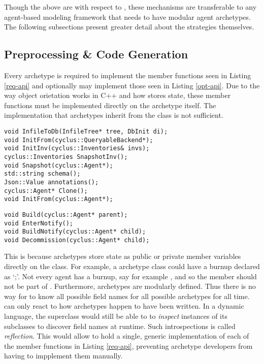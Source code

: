 Though the above are with respect to \cyclus, these mechanisms are 
transferable to any agent-based modeling framework that needs to have modular agent 
archetypes. The following subsections present greater detail about the 
strategies themselves.

\subsection{Preprocessing \& Code Generation}

Every \cyclus archetype is required to implement the member functions 
seen in Listing \ref{req-api} and optionally may implement those seen in 
Listing \ref{opt-api}. Due to the way object orietation works in 
C++ and how \cyclus stores state, these member functions must be implemented directly
on the archetype itself. The implementation that archetypes inherit 
from the  class is not sufficient. 

\begin{lstlisting}[caption={Required Archetype API}, label=req-api]
void InfileToDb(InfileTree* tree, DbInit di);
void InitFrom(cyclus::QueryableBackend*);
void InitInv(cyclus::Inventories& invs);
cyclus::Inventories SnapshotInv();
void Snapshot(cyclus::Agent*);
std::string schema();
Json::Value annotations();
cyclus::Agent* Clone();
void InitFrom(cyclus::Agent*);
\end{lstlisting}

\begin{lstlisting}[caption={Optional Archetype API}, label=opt-api]
void Build(cyclus::Agent* parent);
void EnterNotify();
void BuildNotify(cyclus::Agent* child);
void Decommission(cyclus::Agent* child);
\end{lstlisting}

This is because archetypes store state as public or private member variables
directly on the class.  For example, a  archetype class
could have a burnup declared as `;'. Not every agent has 
a burnup, say for example , and so the  member 
should not be part of . Furthermore, archetypes are modularly 
defined. Thus there is no way for \cyclus to know all possible field names 
for all possible archetypes for all time.  \Cyclus can only react to how 
archetypes happen to have been written. In a dynamic language, the 
superclass would still be able to to \emph{inspect} instances of its subclasses
to discover field names at runtime. Such introspections is called \emph{reflection}. 
This would allow  to hold a single, generic implementation of each of the
member functions in Listing \ref{req-api}, preventing archetype developers from 
having to impplement them manually.

